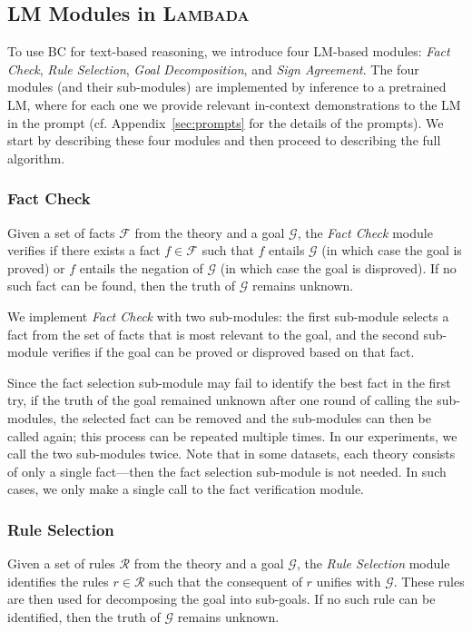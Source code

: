 \documentclass[11pt]{article}
\newcommand{\facts}[1]{\ensuremath{\mathcal{#1}}}
\newcommand{\rules}[1]{\ensuremath{\mathcal{#1}}}
\newcommand{\goal}[1]{\ensuremath{\mathcal{#1}}}
\newcommand{\algo}{\textsc{Lambada}}
\newcommand{\module}[1]{\emph{#1}}
\begin{document}
\subsection{LM Modules in \algo}
To use BC for text-based reasoning, we introduce four LM-based modules: \emph{Fact Check}, \emph{Rule Selection}, \emph{Goal Decomposition}, and \emph{Sign Agreement}. The four modules (and their sub-modules) are implemented by inference to a pretrained LM, where for each one we provide relevant in-context demonstrations to the LM in the prompt (cf. Appendix~\ref{sec:prompts} for the details of the prompts). We start by describing these four modules and then proceed to describing the full algorithm.

\subsubsection{Fact Check} 
Given a set of facts \facts{F} from the theory and a goal \goal{G}, the \module{Fact Check} module verifies if there exists a fact $f\in\facts{F}$ such that $f$ entails \goal{G} (in which case the goal is proved) or $f$ entails the negation of \goal{G} (in which case the goal is disproved). If no such fact can be found, then the truth of \goal{G} remains unknown. 

We implement \module{Fact Check} with two sub-modules: the first sub-module selects a fact from the set of facts that is most relevant to the goal, and the second sub-module verifies if the goal can be proved or disproved based on that fact. 

Since the fact selection sub-module may fail to identify the best fact in the first try, if the truth of the goal remained unknown after one round of calling the sub-modules, the selected fact can be removed and the sub-modules can then be called again; this process can be repeated multiple times. In our experiments, we call the two sub-modules twice. Note that in some datasets, each theory consists of only a single fact---then the fact selection sub-module is not needed. In such cases, we only make a single call to the fact verification module.

\subsubsection{Rule Selection}
Given a set of rules \rules{R} from the theory and a goal \goal{G}, the \module{Rule Selection} module identifies the rules $r\in\rules{R}$ such that the consequent of $r$ unifies with \goal{G}. These rules are then used for decomposing the goal into sub-goals. If no such rule can be identified, then the truth of \goal{G} remains unknown.
\end{document}
